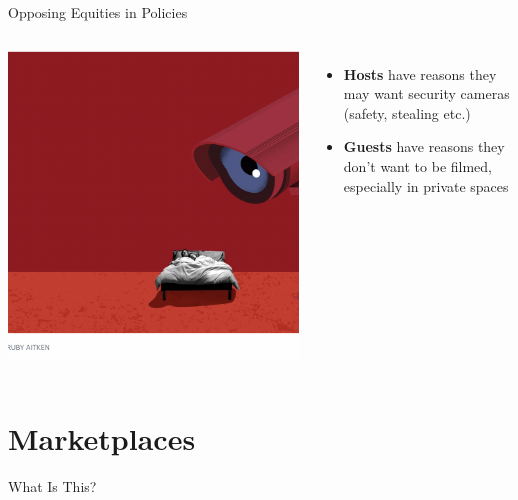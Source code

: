 \documentclass[nobackground,dvipsnames,table,aspectratio=169]{beamer}
\begin{document}
\begin{frame}{Opposing Equities in Policies}
    \begin{columns}
            \includegraphics[width=\textwidth]{airbnb-surveillance}
            \begin{itemize}
                \item \textbf{Hosts} have reasons they may want security cameras (safety, stealing etc.)
                \item \textbf{Guests} have reasons they don’t want to be filmed, especially in private spaces
            \end{itemize}
    \end{columns}
\end{frame}

\section{Marketplaces}

\begin{frame}{What Is This?}
    \centering
\end{frame}
\end{document}
